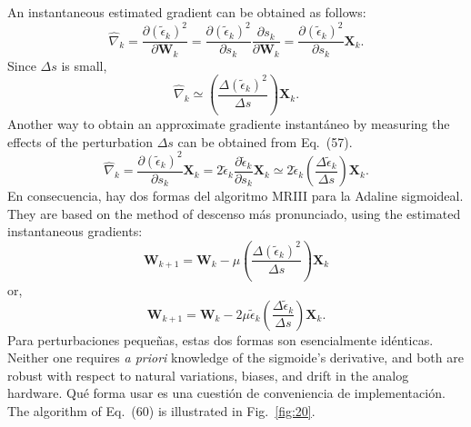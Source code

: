 \documentclass[10pt,twocolumn]{article}
\newcommand{\X}{\bm{X}}
\newcommand{\W}{\bm{W}}
\begin{document}
An instantaneous estimated gradient can be obtained as follows:
\begin{equation}
\hat{\nabla}_k = \frac{\partial(\tilde{\epsilon}_k)^2}{\partial\W_k}
= \frac{\partial(\tilde{\epsilon}_k)^2}{\partial s_k}\frac{\partial s_k}{\partial\W_k}
= \frac{\partial(\tilde{\epsilon}_k)^2}{\partial s_k}\X_k. \tag{57}
\end{equation}
Since $\Delta s$ is small,
\begin{equation}
\hat{\nabla}_k \simeq \left(\frac{\Delta(\tilde{\epsilon}_k)^2}{\Delta s}\right)\X_k. \tag{58}
\end{equation}
Another way to obtain an approximate gradiente instantáneo by measuring the
effects of the perturbation $\Delta s$ can be obtained from Eq.~(57).
\begin{equation}
\hat{\nabla}_k = \frac{\partial(\tilde{\epsilon}_k)^2}{\partial s_k}\X_k
= 2\tilde{\epsilon}_k\frac{\partial\tilde{\epsilon}_k}{\partial s_k}\X_k
\simeq 2\tilde{\epsilon}_k\!\left(\frac{\Delta\tilde{\epsilon}_k}{\Delta s}\right)\X_k. \tag{59}
\end{equation}
En consecuencia, hay dos formas del algoritmo MRIII para la Adaline sigmoideal.
They are based on the method of descenso más pronunciado, using the estimated instantaneous
gradients:
\begin{equation}
\W_{k+1} = \W_k - \mu\!\left(\frac{\Delta(\tilde{\epsilon}_k)^2}{\Delta s}\right)\X_k \tag{60}
\end{equation}
or,
\begin{equation}
\W_{k+1} = \W_k - 2\mu\tilde{\epsilon}_k\!\left(\frac{\Delta\tilde{\epsilon}_k}{\Delta s}\right)\X_k. \tag{61}
\end{equation}
Para perturbaciones pequeñas, estas dos formas son esencialmente idénticas. Neither one
requires \textit{a priori} knowledge of the sigmoide's derivative, and both are
robust with respect to natural variations, biases, and drift in the analog
hardware. Qué forma usar es una cuestión de conveniencia de implementación. The
algorithm of Eq.~(60) is illustrated in Fig.~\ref{fig:20}.
\end{document}
